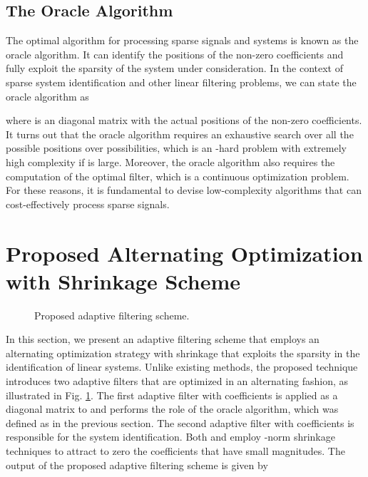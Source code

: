 \documentclass[10pt,onecolumn]{IEEEtran}
\begin{document}
\subsection{The Oracle Algorithm}

The optimal algorithm for processing sparse signals and systems is
known as the oracle algorithm. It can identify the positions of the
non-zero coefficients and fully exploit the sparsity of the system
under consideration. In the context of sparse system identification
and other linear filtering problems, we can state the oracle
algorithm as

where   is an  diagonal
matrix with the actual  positions of the non-zero coefficients.
It turns out that the oracle algorithm requires an exhaustive search
over all the possible  positions over  possibilities, which is
an -hard problem with extremely high complexity if  is large.
Moreover, the oracle algorithm also requires the computation of the
optimal filter, which is a continuous optimization problem. For
these reasons, it is fundamental to devise low-complexity algorithms
that can cost-effectively process sparse signals.

\section{Proposed Alternating Optimization with Shrinkage Scheme}


\begin{figure}[!htb]
\begin{center}
\def\epsfsize#1#2{0.7\columnwidth}
 \vspace{-0.5em}\caption{ Proposed adaptive
filtering scheme.}\label{fig:alt}
\end{center}
\end{figure}

In this section, we present an adaptive filtering scheme that
employs an alternating optimization strategy with shrinkage that
exploits the sparsity in the identification of linear systems.
Unlike existing methods, the proposed technique introduces two
adaptive filters that are optimized in an alternating fashion, as
illustrated in Fig. \ref{fig:alt}. The first adaptive filter
 with  coefficients is applied as a diagonal
matrix  to
 and performs the role of the oracle algorithm,
which was defined as  in the previous
section. The second adaptive filter  with 
coefficients is responsible for the system identification. Both
 and  employ -norm
shrinkage techniques to attract to zero the coefficients that have
small magnitudes.  The output of the proposed adaptive filtering
scheme is given by
\end{document}
